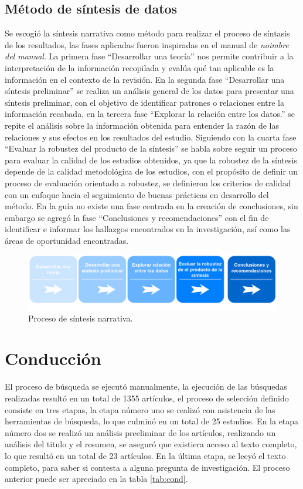 \documentclass[conference,onecolumn,10pt]{IEEEtran}
\begin{document}
\subsection{Método de síntesis de datos}
Se escogió la síntesis narrativa como método para realizar el proceso de síntasis de los resultados, las fases aplicadas fueron 
inspiradas en el manual de \emph{noimbre del manual}. La primera fase “Desarrollar una teoría” nos permite contribuir a la 
interpretación de la información recopilada y evalúa qué tan aplicable es la información en el contexto de la revisión. 
En la segunda fase “Desarrollar una síntesis preliminar” se realiza un análisis general de los datos para presentar una síntesis 
preliminar, con el objetivo de identificar patrones o relaciones entre la información recabada, en la tercera fase 
“Explorar la relación entre los datos.” se repite el análisis sobre la información obtenida para entender la razón de las relaciones y sus efectos 
en los resultados del estudio. Siguiendo con la cuarta fase “Evaluar la robustez del producto de la síntesis” se habla sobre seguir un proceso 
para evaluar la calidad de los estudios obtenidos, ya que la robustez de la síntesis depende de la calidad metodológica de los estudios, con el 
propósito de definir un proceso de evaluación orientado a robustez, se definieron los criterios de calidad con un enfoque hacia el seguimiento de 
buenas prácticas en desarrollo del método. 
En la guía no existe una fase centrada en la creación de conclusiones, sin embargo se agregó la fase “Conclusiones y recomendaciones” 
con el fin de identificar e informar los hallazgos encontrados en la investigación, así como las áreas de oportunidad encontradas.

\begin{figure}[!htb]
   \includegraphics[width=\linewidth]{narrativa.png}
   \caption{Proceso de síntesis narrativa.}
   \label{fig:sistesisnarrativa}
\end{figure}
\newpage

\section{Conducción}
El proceso de búsqueda se ejecutó manualmente, la ejecución de las búsquedas realizadas resultó en un total de 
1355 artículos, el proceso de selección definido consiste en tres etapas, la etapa número uno se realizó 
con asistencia de las herramientas de búsqueda, lo que culminó en un total de 25 estudios. En la etapa número dos 
se realizó un análisis preeliminar de los artículos, realizando un análisis del titulo y el resumen, se aseguró que 
existiera acceso al texto completo, lo que resultó en  un total de 23 artículos. En la última etapa, se leeyó el 
texto completo, para saber si contesta a alguna pregunta de investigación. El proceso anterior puede ser apreciado en la tabla \ref{tab:cond}.
\end{document}

